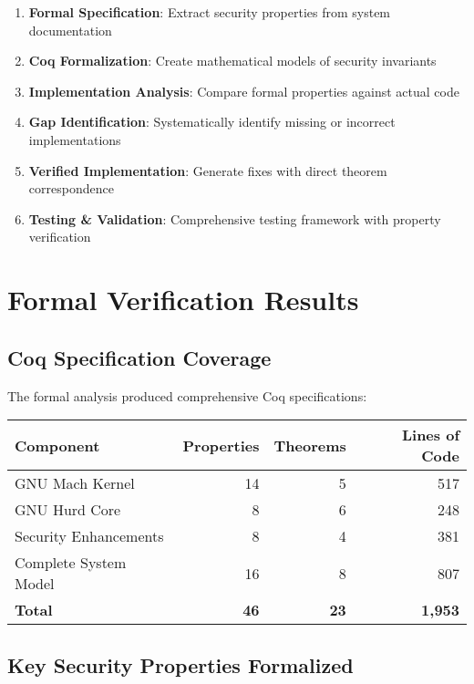 \documentclass[11pt,a4paper]{article}
\begin{document}
\begin{enumerate}
    \item \textbf{Formal Specification}: Extract security properties from system documentation
    \item \textbf{Coq Formalization}: Create mathematical models of security invariants
    \item \textbf{Implementation Analysis}: Compare formal properties against actual code
    \item \textbf{Gap Identification}: Systematically identify missing or incorrect implementations
    \item \textbf{Verified Implementation}: Generate fixes with direct theorem correspondence
    \item \textbf{Testing \& Validation}: Comprehensive testing framework with property verification
\end{enumerate}

\section{Formal Verification Results}

\subsection{Coq Specification Coverage}

The formal analysis produced comprehensive Coq specifications:

\begin{center}
\begin{tabular}{|l|r|r|r|}
\hline
\textbf{Component} & \textbf{Properties} & \textbf{Theorems} & \textbf{Lines of Code} \\
\hline
GNU Mach Kernel & 14 & 5 & 517 \\
GNU Hurd Core & 8 & 6 & 248 \\
Security Enhancements & 8 & 4 & 381 \\
Complete System Model & 16 & 8 & 807 \\
\hline
\textbf{Total} & \textbf{46} & \textbf{23} & \textbf{1,953} \\
\hline
\end{tabular}
\end{center}

\subsection{Key Security Properties Formalized}
\end{document}
